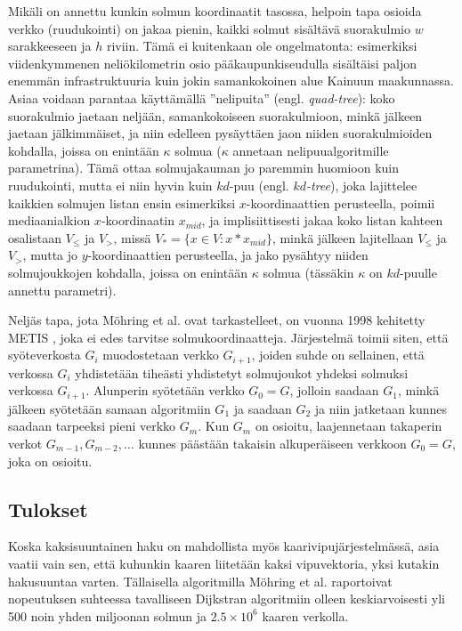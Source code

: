 \documentclass[finnish]{tktltiki2}
\theoremstyle{definition}
\theoremstyle{remark}
\begin{document}
 Mikäli on annettu kunkin solmun koordinaatit tasossa, helpoin tapa osioida verkko (ruudukointi) on jakaa pienin, kaikki solmut sisältävä suorakulmio $w$ sarakkeeseen ja $h$ riviin. Tämä ei kuitenkaan ole ongelmatonta: esimerkiksi viidenkymmenen neliökilometrin osio pääkaupunkiseudulla sisältäisi paljon enemmän infrastruktuuria kuin jokin samankokoinen alue Kainuun maakunnassa. Asiaa voidaan parantaa käyttämällä ''nelipuita'' (engl. \textit{quad-tree}): koko suorakulmio jaetaan neljään, samankokoiseen suorakulmioon, minkä jälkeen jaetaan jälkimmäiset, ja niin edelleen pysäyttäen jaon niiden suorakulmioiden kohdalla, joissa on enintään $\kappa$ solmua ($\kappa$ annetaan nelipuualgoritmille parametrina). Tämä ottaa solmujakauman jo paremmin huomioon kuin ruudukointi, mutta ei niin hyvin kuin $kd$-puu (engl. \textit{$kd$-tree}), joka lajittelee kaikkien solmujen listan ensin esimerkiksi $x$-koordinaattien perusteella, poimii mediaanialkion $x$-koordinaatin $x_{mid}$, ja implisiittisesti jakaa koko listan kahteen osalistaan $V_{\leq}$ ja $V_{>}$, missä $V_{\ast} = \{ x \in V \colon x \ast x_{mid}\}$, minkä jälkeen lajitellaan $V_{\leq}$ ja $V_{>}$, mutta jo $y$-koordinaattien perusteella, ja jako pysähtyy niiden solmujoukkojen kohdalla, joissa on enintään $\kappa$ solmua (tässäkin $\kappa$ on $kd$-puulle annettu parametri).
 
 Neljäs tapa, jota Möhring et al. ovat tarkastelleet, on vuonna 1998 kehitetty METIS \cite{Karypis98}, joka ei edes tarvitse solmukoordinaatteja. Järjestelmä toimii siten, että syöteverkosta $G_i$ muodostetaan verkko $G_{i + 1}$, joiden suhde on sellainen, että verkossa $G_i$ yhdistetään tiheästi yhdistetyt solmujoukot yhdeksi solmuksi verkossa $G_{i + 1}$. Alunperin syötetään verkko $G_0 = G$, jolloin saadaan $G_1$, minkä jälkeen syötetään samaan algoritmiin $G_1$ ja saadaan $G_2$ ja niin jatketaan kunnes saadaan tarpeeksi pieni verkko $G_m$. Kun $G_m$ on osioitu, laajennetaan takaperin verkot $G_{m - 1}, G_{m - 2}, \dots$ kunnes päästään takaisin alkuperäiseen verkkoon $G_0 = G$, joka on osioitu.
 
\subsection{Tulokset}
Koska kaksisuuntainen haku on mahdollista myös kaarivipujärjestelmässä, asia vaatii vain sen, että kuhunkin kaaren liitetään kaksi vipuvektoria, yksi kutakin hakusuuntaa varten. Tällaisella algoritmilla Möhring et al. raportoivat nopeutuksen suhteessa tavalliseen Dijkstran algoritmiin olleen keskiarvoisesti yli 500 noin yhden miljoonan solmun ja $2.5 \times 10^6$ kaaren verkolla.
 
\end{document}
